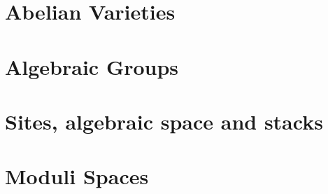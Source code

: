 \documentclass[sectionlevel=book]{noteformyself}
\begin{document}
    \chapter{Abelian Varieties}
        
        


    \chapter{Algebraic Groups}
        
        
        
        
        


    \chapter{Sites, algebraic space and stacks}
        
        
        


    \chapter{Moduli Spaces}
        
        




    \printbibliography[heading=bibintoc, title={References}]
    
\end{document}
